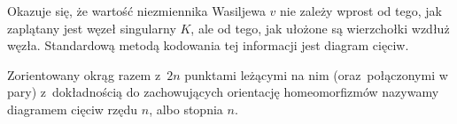 
Okazuje się, że wartość niezmiennika Wasiljewa $v$ nie zależy wprost od tego, jak zaplątany jest węzeł singularny $K$, ale od tego, jak ułożone są wierzchołki wzdłuż węzła. Standardową metodą kodowania tej informacji jest diagram cięciw.

\begin{definition}
%
    Zorientowany okrąg razem z~$2n$ punktami leżącymi na nim (oraz~połączonymi w pary) z~dokładnością do zachowujących orientację homeomorfizmów nazywamy diagramem cięciw rzędu $n$, albo stopnia $n$.
\end{definition}

